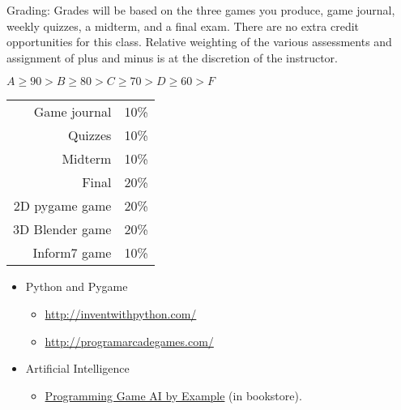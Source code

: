 \documentclass{article}
\begin{document}
\begin{description}
\begin{multicols}{2}
\item [Grading:] Grades will be based on the three games you
  produce, game journal, weekly quizzes, a midterm, and a final exam.
  There are no extra credit opportunities for this class.  Relative
  weighting of the various assessments and assignment of plus and
  minus is at the discretion of the instructor.

$A \ge 90 > B \ge 80 > C \ge 70 > D \ge 60 > F$

\columnbreak

\begin{centering}
\begin{tabular}{|rr|}\hline
 Game journal &    10\%\\
 Quizzes &         10\%\\
 Midterm &         10\%\\
 Final &           20\%\\
 2D pygame game &  20\%\\
 3D Blender game & 20\%\\
 Inform7 game &        10\%\\
\hline
\end{tabular}

\end{centering}
\end{multicols}



\item[Texts and Readings:] \mbox{}
\begin{itemize}

\item Python and Pygame
\begin{itemize}
 \item \url{http://inventwithpython.com/}
\item \url{http://programarcadegames.com/}
\end{itemize}

\item{Artificial Intelligence}
\begin{itemize}
\item \href{http://www.ai-junkie.com/books/toc_pgaibe.html}
{Programming Game AI by Example} (in bookstore).

\end{itemize}


\end{itemize}
\end{description}
\end{document}
